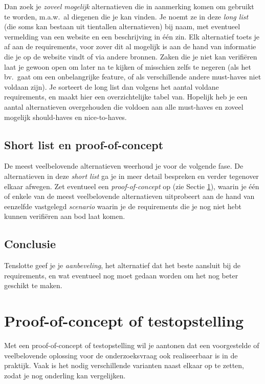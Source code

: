Dan zoek je \emph{zoveel mogelijk} alternatieven die in aanmerking komen om gebruikt te worden, m.a.w.~al diegenen die je kan vinden. Je noemt ze in deze \emph{long list} (die soms kan bestaan uit tientallen alternatieven) bij naam, met eventueel vermelding van een website en een beschrijving in één zin. Elk alternatief toets je af aan de requirements, voor zover dit al mogelijk is aan de hand van informatie die je op de website vindt of via andere bronnen. Zaken die je niet kan verifiëren laat je gewoon open om later na te kijken of misschien zelfs te negeren (als het bv.~gaat om een onbelangrijke feature, of als verschillende andere must-haves niet voldaan zijn). Je sorteert de long list dan volgens het aantal voldane requirements, en maakt hier een overzichtelijke tabel van. Hopelijk heb je een aantal alternatieven overgehouden die voldoen aan alle must-haves en zoveel mogelijk should-haves en nice-to-haves.

\subsection{Short list en proof-of-concept}
\label{ssec:short-list-poc}

 De meest veelbelovende alternatieven weerhoud je voor de volgende fase. De alternatieven in deze \emph{short list} ga je in meer detail bespreken en verder tegenover elkaar afwegen. Zet eventueel een \emph{proof-of-concept} op (zie Sectie \ref{sec:poc-testopstelling}), waarin je één of enkele van de meest veelbelovende alternatieven uitprobeert aan de hand van eenzelfde vastgelegd \emph{scenario} waarin je de requirements die je nog niet hebt kunnen verifiëren aan bod laat komen.

\subsection{Conclusie}
\label{ssec:vgl-studie-conclusie}

Tenslotte geef je je \emph{aanbeveling}, het alternatief dat het beste aansluit bij de requirements, en wat eventueel nog moet gedaan worden om het nog beter geschikt te maken.

\section{Proof-of-concept of testopstelling}
\label{sec:poc-testopstelling}

Met een proof-of-concept of testopstelling wil je aantonen dat een voorgestelde of veelbelovende oplossing voor de onderzoeksvraag ook realiseerbaar is in de praktijk. Vaak is het nodig verschillende varianten naast elkaar op te zetten, zodat je nog onderling kan vergelijken.

